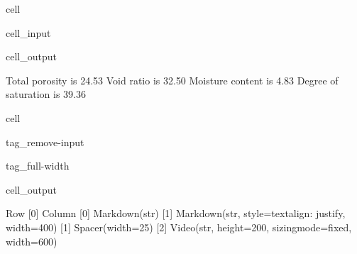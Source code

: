 \documentclass[letterpaper,10pt,english]{jupyterBook}
\begin{document}
\begin{sphinxuseclass}{cell}
\begin{sphinxVerbatimInput}
\begin{sphinxuseclass}{cell_input}
\begin{sphinxVerbatim}[commandchars=\\\{\}]
\end{sphinxVerbatim}

\end{sphinxuseclass}\end{sphinxVerbatimInput}
\begin{sphinxVerbatimOutput}

\begin{sphinxuseclass}{cell_output}
\begin{sphinxVerbatim}[commandchars=\\\{\}]
Total porosity is 24.53\PYGZpc{}
Void ratio is 32.50\PYGZpc{}
Moisture content is 4.83\PYGZpc{}
Degree of saturation is 39.36\PYGZpc{}
\end{sphinxVerbatim}

\end{sphinxuseclass}\end{sphinxVerbatimOutput}

\end{sphinxuseclass}
\begin{sphinxuseclass}{cell}
\begin{sphinxuseclass}{tag_remove-input}
\begin{sphinxuseclass}{tag_full-width}\begin{sphinxVerbatimOutput}

\begin{sphinxuseclass}{cell_output}
\begin{sphinxVerbatim}[commandchars=\\\{\}]
Row
    [0] Column
        [0] Markdown(str)
        [1] Markdown(str, style=\PYGZob{}\PYGZsq{}text\PYGZhy{}align\PYGZsq{}: \PYGZsq{}justify\PYGZsq{}\PYGZcb{}, width=400)
    [1] Spacer(width=25)
    [2] Video(str, height=200, sizing\PYGZus{}mode=\PYGZsq{}fixed\PYGZsq{}, width=600)
\end{sphinxVerbatim}

\end{sphinxuseclass}\end{sphinxVerbatimOutput}

\end{sphinxuseclass}
\end{sphinxuseclass}
\end{sphinxuseclass}
\end{document}
